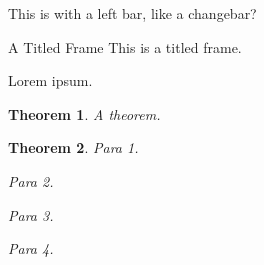 \documentclass{article}
\newtheorem{thm}{Theorem}
\begin{document}
\begin{leftbar}
This is with a left bar, like a changebar?
\end{leftbar}

\begin{titled-frame}{A Titled Frame}
This is a titled frame.
\end{titled-frame}

\begin{framed}
Lorem ipsum.
\begin{thm}
  A theorem.
\end{thm}
\end{framed}

\begin{shaded}
\begin{thm}
Para 1.
 
Para 2.
 

Para 3.
 
 
 
Para 4.
\end{thm}\end{shaded}
\end{document}
